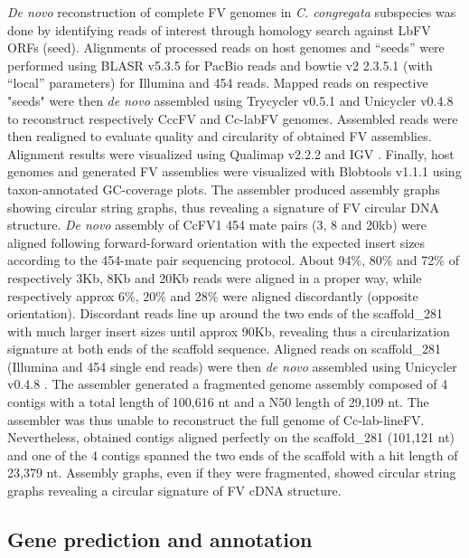 \textit{De novo} reconstruction of complete FV genomes in \textit{C. congregata} subspecies was done by identifying reads of interest through homology search against  LbFV ORFs (seed). Alignments of processed reads on host genomes and “seeds” were performed using BLASR v5.3.5 \citep{chaisson_mapping_2012} for PacBio reads and bowtie v2 2.3.5.1 (with “local” parameters) \citep{langmead_ultrafast_2009} for Illumina and 454 reads. Mapped reads on respective "seeds" were then \textit{de novo} assembled using Trycycler v0.5.1 \citep{wick_trycycler_2021} and Unicycler v0.4.8 \citep{wick_unicycler_2017} to reconstruct respectively CccFV and Cc-labFV genomes. Assembled reads were then realigned to evaluate quality and circularity of obtained FV assemblies. Alignment results were visualized using Qualimap v2.2.2 \citep{okonechnikov_qualimap_2015} and IGV \citep{robinson_integrative_2011}. Finally, host genomes and generated FV assemblies were visualized with Blobtools v1.1.1 \citep{laetsch_blobtools_2017} using taxon-annotated GC-coverage plots. The assembler produced assembly graphs showing circular string graphs, thus revealing a signature of FV circular DNA structure. \textit{De novo} assembly of CcFV1 454 mate pairs (3, 8 and 20kb) were aligned following forward-forward orientation with the expected insert sizes according to the 454-mate pair sequencing protocol. About 94\%, 80\% and 72\% of respectively 3Kb, 8Kb and 20Kb reads were aligned in a proper way, while respectively approx 6\%, 20\% and 28\% were aligned discordantly (opposite orientation). Discordant reads line up around the two ends of the scaffold\_281 with much larger insert sizes until approx 90Kb, revealing thus a circularization signature at both ends of the scaffold sequence. Aligned reads on scaffold\_281 (Illumina and 454 single end reads) were then \textit{de novo} assembled using Unicycler v0.4.8 \citep{wick_unicycler_2017}. The assembler generated a fragmented genome assembly composed of 4 contigs with a total length of 100,616 nt and a N50 length of 29,109 nt. The assembler was thus unable to reconstruct the full genome of Cc-lab-lineFV. Nevertheless, obtained contigs aligned perfectly on the scaffold\_281 (101,121 nt) and one of the 4 contigs spanned the two ends of the scaffold with a hit length of 23,379 nt. Assembly graphs, even if they were fragmented, showed circular string graphs revealing a circular signature of FV cDNA structure. 

\subsection{Gene prediction and annotation} 

